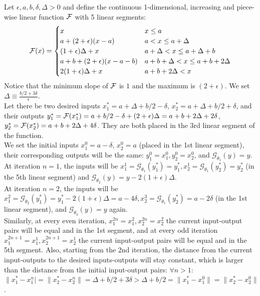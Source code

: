 \documentclass[nohyperref]{article}
\begin{document}
\begin{example}\label{ex:negative}
    Let $\epsilon,a,b,\delta,\Delta>0$ and define the continuous 1-dimensional, increasing and piece-wise linear function $\mathcal{F}$ with 5 linear segments:
    \begin{align*}
        \mathcal{F}(x)=\begin{cases}
            x & x\leq a\\
            a + (2+\epsilon)(x-a) & a< x \leq a+\Delta \\
            (1+\epsilon)\Delta + x & a + \Delta < x \leq a + \Delta + b\\
            a + b + (2+\epsilon)(x-a-b) & a + b + \Delta < x \leq a + b + 2\Delta\\
            2(1+\epsilon)\Delta + x  & a + b + 2\Delta < x 
        \end{cases}
    \end{align*}
    Notice that the minimum slope of $\mathcal{F}$ is $1$ and the maximum is $(2+\epsilon)$.
    We set $\Delta\equiv\frac{b/2+3\delta}{\epsilon}$. \\
    Let there be two desired inputs $x_1^*=a+\Delta+ b/2-\delta$, $x_2^*=a+\Delta+ b/2 + \delta$, and their outputs $y_1^*=\mathcal{F}(x_1^*)=a+b/2-\delta+(2+\epsilon)\Delta=a+b+2\Delta+2\delta$, $y_2^*=\mathcal{F}(x_2^*)=a+b+2\Delta+4\delta$. They are both placed in the 3rd linear segment of the function.\\
    We set the initial inputs $x_1^0=a-\delta$, $x_2^0=a$ (placed in the 1st linear segment), their corresponding outputs will be the same: $y_1^0=x_1^0, y_2^0=x_2^0$, and $\mathcal{G}_{\theta_1}(y)=y$.\\
    At iteration $n=1$, the inputs will be $x_1^1=\mathcal{G}_{\theta_1}(y_1^*)=y_1^*, x_2^1=\mathcal{G}_{\theta_1}(y_2^*)=y_2^*$ (in the 5th linear segment) and $\mathcal{G}_{\theta_2}(y)=y-2(1+\epsilon)\Delta$. \\
    At iteration $n=2$, the inputs will be $x_1^2=\mathcal{G}_{\theta_2}(y_1^*)=y_1^*-2(1+\epsilon)\Delta=a-4\delta, x_2^3=\mathcal{G}_{\theta_1}(y_2^*)=a-2\delta$ (in the 1st linear segment), and $\mathcal{G}_{\theta_3}(y)=y$ again. \\
    Similarly, at every even iteration, $x_1^{2n}=x_1^2, x_2^{2n}=x_2^2$ the current input-output pairs will be equal and in the 1st segment, and at every odd iteration $x_1^{2n+1}=x_1^1, x_2^{2n+1}=x_2^1$ the current input-output pairs will be equal and in the 5th segment. Also, starting from the 2nd iteration, the distance from the current input-outputs to the desired inputs-outputs will stay constant, which is larger than the distance from the initial input-output pairs: $\forall n>1$: $\| x_1^* - x_1^{n} | = \| x_2^* - x_2^{n} \| = \Delta + b/2 + 3\delta > \Delta + b/2 = \| x_1^* - x_1^0 \| = \| x_2^* - x_2^0 \|$.
\end{example}
\end{document}
